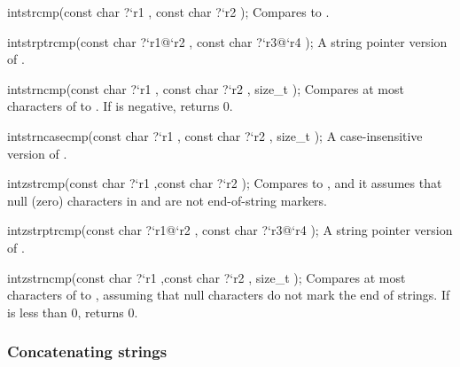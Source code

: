 \begin{defun2}{int}{strcmp}{(const char {?}`r1 , const char {?}`r2 );}
  Compares  to .
\end{defun2}

\begin{defun2}{int}{strptrcmp}{(const char {?}`r1@`r2 , const char {?}`r3@`r4 );}
  A string pointer version of .
\end{defun2}

\begin{defun2}{int}{strncmp}{(const char {?}`r1 , const char {?}`r2 , size_t );}
  Compares at most  characters of  to .  If
   is negative,  returns 0.
\end{defun2}

\begin{defun2}{int}{strncasecmp}{(const char {?}`r1 , const char {?}`r2 , size_t );}
  A case-insensitive version of .
\end{defun2}

\begin{defun2}{int}{zstrcmp}{(const char {?}`r1 ,const char {?}`r2 );}
  Compares  to , and it assumes that null (zero)
  characters in  and  are not end-of-string markers.
\end{defun2}

\begin{defun2}{int}{zstrptrcmp}{(const char {?}`r1@`r2 , const char {?}`r3@`r4 );}
  A string pointer version of .
\end{defun2}

\begin{defun2}{int}{zstrncmp}{(const char {?}`r1 ,const char {?}`r2 , size_t );}
  Compares at most  characters of  to ,
  assuming that null characters do not mark the end of strings.  If
   is less than 0,  returns 0.
\end{defun2}

\subsubsection*{Concatenating strings}

\begin{verbatim}
\end{verbatim}

